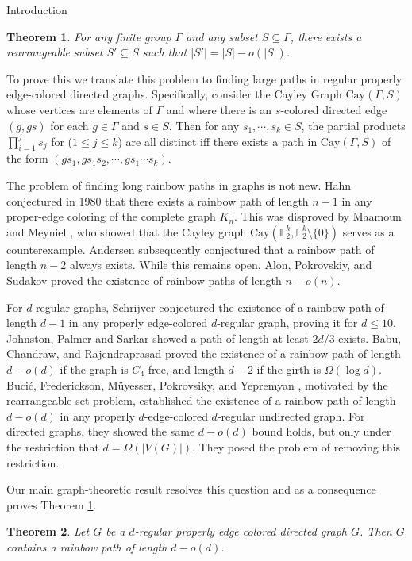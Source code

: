 \documentclass[11pt,a4paper]{article}
\newtheorem{theorem}{Theorem}
\newcommand{\FF}{\mathbb F}
\newcommand{\Cay}{\mathrm{Cay}}
\begin{document}
\begin{section}{Introduction}
\medskip

\begin{theorem} \label{main_group} For any finite group $\Gamma$ and any subset $S \subseteq \Gamma$, there exists a rearrangeable subset $S' \subseteq S$ such that $|S'| = |S| - o(|S|)$.
\end{theorem}

\medskip

To prove this we translate this problem to finding large paths in regular properly edge-colored directed graphs. Specifically, consider the Cayley Graph $\Cay(\Gamma, S)$ whose vertices are elements of $\Gamma$ and where there is an $s$-colored directed edge $(g, gs)$ for each $g \in 
\Gamma$ and $s \in S$. Then for any $s_1, \cdots, s_k \in S$, the partial products $\prod_{i = 1}^j s_j$ for ($1 \leq j \leq k$) are all distinct iff there exists a path in $\Cay(\Gamma, S)$ of the form $( g s_1, g s_1 s_2, \cdots, g s_1 \cdots s_k)$.

\medskip

The problem of finding long rainbow paths in graphs is not new. Hahn \cite{Ha} conjectured in 1980 that there exists a rainbow path of length $n - 1$ in any proper-edge coloring of the complete graph $K_n$. This was disproved by Maamoun and Meyniel \cite{MM}, who showed that the Cayley graph $\Cay (\FF_2^k, \FF_2^k \setminus \{0\})$ serves as a counterexample. Andersen \cite{An} subsequently conjectured that a rainbow path of length $n - 2$ always exists. While this remains open, Alon, Pokrovskiy, and Sudakov \cite{APS} proved the existence of rainbow paths of length $n - o(n)$.

\medskip

For $d$-regular graphs, Schrijver \cite{Sc} conjectured the existence of a rainbow path of length $d - 1$ in any properly edge-colored $d$-regular graph, proving it for $d \leq 10$. Johnston, Palmer and Sarkar \cite{JPS} showed a path of length at least $2d/3$ exists. Babu, Chandraw, and Rajendraprasad \cite{BCR} proved the existence of a rainbow path of length $d - o(d)$ if the graph is $C_4$-free, and length $d - 2$ if the girth is $\Omega( \log d)$. Buci\'c, Frederickson, M\"uyesser, Pokrovsiky, and Yepremyan \cite{BFMPY}, motivated by the rearrangeable set problem, established the existence of a rainbow path of length $d - o(d)$ in any properly $d$-edge-colored $d$-regular undirected graph. For directed graphs, they showed the same $d - o(d)$ bound holds, but only under the restriction that $d = \Omega( |V(G)|)$. They posed the problem of removing this restriction.

\medskip

Our main graph-theoretic result resolves this question and as a consequence proves Theorem \ref{main_group}.
\begin{theorem} \label{main} Let $G$ be a $d$-regular properly edge colored directed graph $G$. Then $G$ contains a rainbow path of length $ d - o(d)$.
\end{theorem}
\end{section}
\end{document}
